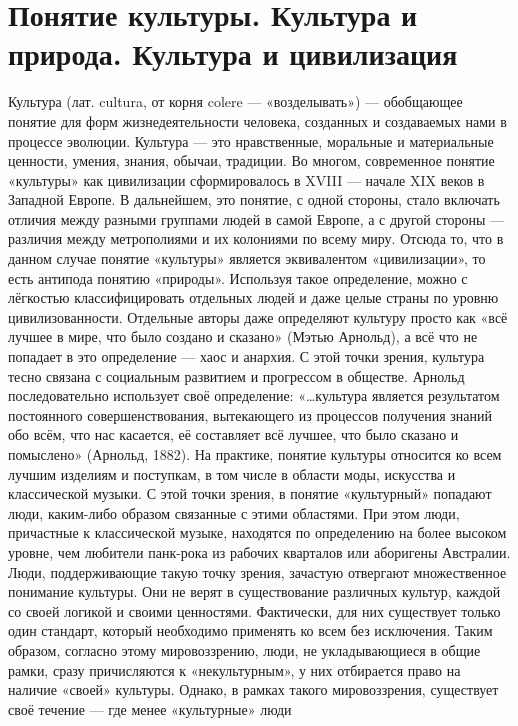 \documentclass[12pt]{article}
\begin{document}
\newpage
\section{Понятие культуры. Культура и природа. Культура и цивилизация}
Культура (лат. cultura, от корня colere — «возделывать») — обобщающее понятие для форм жизнедеятельности
человека, созданных и создаваемых нами в процессе эволюции. Культура — это нравственные, моральные и
материальные ценности, умения, знания, обычаи, традиции. 
Во многом, современное понятие «культуры» как цивилизации сформировалось в XVIII — начале XIX веков в
Западной  Европе.  В  дальнейшем,  это  понятие,  с  одной  стороны,  стало  включать  отличия  между  разными
группами людей в самой Европе, а с другой стороны — различия между метрополиями и их колониями по
всему миру. Отсюда то, что в данном случае понятие «культуры» является эквивалентом «цивилизации», то есть
антипода понятию «природы». Используя такое определение, можно с лёгкостью классифицировать отдельных
людей и даже целые страны по уровню цивилизованности. Отдельные авторы даже определяют культуру просто
как «всё лучшее в мире, что было создано и сказано» (Мэтью Арнольд), а всё что не попадает в это определение
— хаос и анархия. С этой точки зрения, культура тесно связана с социальным развитием и прогрессом в
обществе.  Арнольд  последовательно  использует  своё  определение:  «…культура  является  результатом
постоянного совершенствования, вытекающего из процессов получения знаний обо всём, что нас касается, её
составляет всё лучшее, что было сказано и помыслено» (Арнольд, 1882).
На практике, понятие культуры относится ко всем лучшим изделиям и поступкам, в том числе в области моды,
искусства и классической музыки. С этой точки зрения, в понятие «культурный» попадают люди, каким-либо
образом  связанные  с этими  областями. При  этом  люди, причастные к  классической  музыке, находятся  по
определению  на  более  высоком  уровне,  чем  любители  панк-рока  из  рабочих  кварталов  или  аборигены
Австралии.
Люди, поддерживающие такую точку зрения, зачастую отвергают множественное понимание культуры. Они не
верят в существование различных культур, каждой со своей логикой и своими ценностями. Фактически, для них
существует только один стандарт, который необходимо применять ко всем без исключения. Таким образом,
согласно  этому  мировоззрению,  люди,  не  укладывающиеся  в  общие  рамки,  сразу  причисляются  к
«некультурным», у них отбирается право на наличие «своей» культуры.
Однако,  в  рамках  такого  мировоззрения,  существует  своё  течение  —  где  менее  «культурные»  люди
\end{document}
